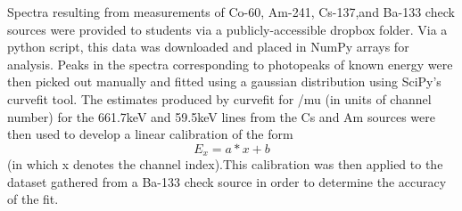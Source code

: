 Spectra resulting from measurements of Co-60, Am-241, Cs-137,and Ba-133 check
sources were provided to students via a publicly-accessible dropbox folder. Via
a python script, this data was downloaded and placed in NumPy arrays for
analysis. Peaks in the spectra corresponding to photopeaks of known energy were
then picked out manually and fitted using a gaussian distribution using SciPy's
curvefit tool. The estimates produced by curvefit for /mu (in units of channel number) for the
661.7keV and 59.5keV lines from the Cs and Am sources were then
used to develop a linear calibration of the form \[E_x = a*x + b\] (in which x denotes
the channel index).This calibration was then applied to the dataset gathered from
a Ba-133 check source in order to determine the accuracy of the fit.
